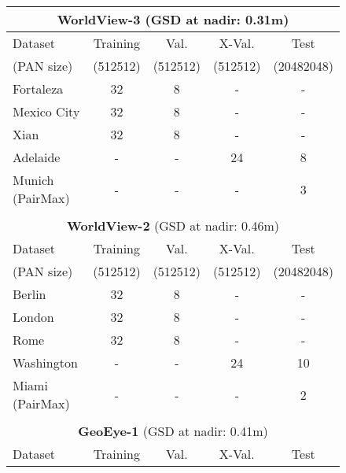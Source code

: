 \documentclass[journal]{IEEEtran}
\begin{document}
\begin{figure}
\begin{table}
\centering
\setlength{\tabcolsep}{4pt}
\begin{tabular}{lcccc}
\multicolumn{5}{c}{{\bf WorldView-3} (GSD at nadir: 0.31m)}                                     \\ \hline
Dataset           &     Training     &        Val.      &       X-Val.     &        Test        \\
(PAN size)        & (512512) & (512512) & (512512) & (20482048) \\ \hline
Fortaleza         &               32 &                8 &                - &                  - \\
Mexico City       &               32 &                8 &                - &                  - \\
Xian              &               32 &                8 &                - &                  - \\
Adelaide          &                - &                - &               24 &                  8 \\
Munich (PairMax)  &                - &                - &                - &                  3 \\ \hline \\
\multicolumn{5}{c}{{\bf WorldView-2} (GSD at nadir: 0.46m)}                                     \\ \hline
Dataset           &     Training     &        Val.      &       X-Val.     &        Test        \\
(PAN size)        & (512512) & (512512) & (512512) & (20482048) \\ \hline
Berlin            &               32 &                8 &                - &                  - \\
London            &               32 &                8 &                - &                  - \\
Rome              &               32 &                8 &                - &                  - \\
Washington        &                - &                - &               24 &                 10 \\
Miami (PairMax)   &                - &                - &                - &                  2 \\ \hline \\
\multicolumn{5}{c}{{\bf GeoEye-1} (GSD at nadir: 0.41m)}                                        \\ \hline
Dataset           &     Training     &        Val.      &       X-Val.     &        Test        \\

\end{tabular}
\end{table}
\end{figure}
\end{document}
